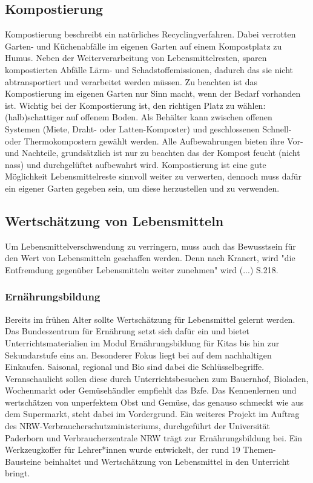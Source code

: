  

\subsection{Kompostierung}
Kompostierung beschreibt ein natürliches Recyclingverfahren. Dabei verrotten Garten- und Küchenabfälle im eigenen Garten auf einem Kompostplatz zu Humus. Neben der Weiterverarbeitung von Lebensmittelresten, sparen kompostierten Abfälle Lärm- und Schadstoffemissionen, dadurch das sie nicht abtransportiert und verarbeitet werden müssen. Zu beachten ist das Kompostierung im eigenen Garten nur Sinn macht, wenn der Bedarf vorhanden ist.
Wichtig bei der Kompostierung ist, den richtigen Platz zu wählen: (halb)schattiger auf offenem Boden. Als Behälter kann zwischen offenen Systemen (Miete, Draht- oder Latten-Komposter) und geschlossenen Schnell- oder Thermokompostern gewählt werden. Alle Aufbewahrungen bieten ihre Vor- und Nachteile, grundsätzlich ist nur zu beachten das der Kompost feucht (nicht nass) und durchgelüftet aufbewahrt wird. %
Kompostierung ist eine gute Möglichkeit Lebensmittelreste sinnvoll weiter zu verwerten, dennoch muss dafür ein eigener Garten gegeben sein, um diese herzustellen und zu verwenden.

\subsection{Wertschätzung von Lebensmitteln}
Um Lebensmittelverschwendung zu verringern, muss auch das Bewusstsein für den Wert von Lebensmitteln geschaffen werden. Denn nach Kranert, wird "die Entfremdung gegenüber Lebensmitteln weiter zunehmen" wird (...) S.218. \subsubsection{Ernährungsbildung}
Bereits im frühen Alter sollte Wertschätzung für Lebensmittel gelernt werden. Das Bundeszentrum für Ernährung setzt sich dafür ein und bietet Unterrichtsmaterialien im Modul Ernährungsbildung für Kitas bis hin zur Sekundarstufe eins an. %
Besonderer Fokus liegt bei auf dem nachhaltigen Einkaufen. Saisonal, regional und Bio sind dabei die Schlüsselbegriffe. Veranschaulicht sollen diese durch Unterrichtsbesuchen zum Bauernhof, Bioladen, Wochenmarkt oder Gemüsehändler empfiehlt das Bzfe. Das Kennenlernen und wertschätzen von unperfektem Obst und Gemüse, das genauso schmeckt wie aus dem Supermarkt, steht dabei im Vordergrund. %
Ein weiteres Projekt im Auftrag des NRW-Verbraucherschutzministeriums, durchgeführt der Universität Paderborn und Verbraucherzentrale NRW trägt zur Ernährungsbildung bei. Ein Werkzeugkoffer für Lehrer*innen wurde entwickelt, der rund 19 Themen-Bausteine beinhaltet und Wertschätzung von Lebensmittel in den Unterricht bringt. %
